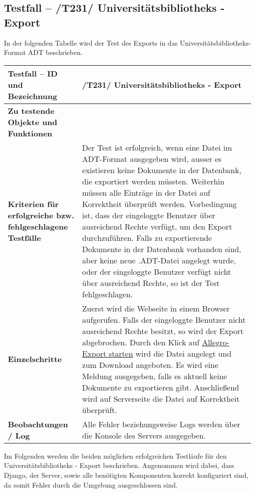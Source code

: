 \subsection{Testfall -- /T231/ Universitätsbibliotheks - Export}
In der folgenden Tabelle wird der Test des Exports in das
Universitätsbibliotheks-Format ADT beschrieben.
\begin{longtable}{|p{5cm}|p{10cm}|}
\hline
\textbf{Testfall -- ID und Bezeichnung} &  \textnormal{/T231/ Universitätsbibliotheks - Export} \\
\hline
\textbf{Zu testende Objekte und Funktionen} & 
\textnormal{
\begin{itemize}
  \item In Komponente \textit{Server (App: Documents)} die Funktion
	\lstinline{extras_allegro.export_allegro()}
\end{itemize} } \\
\hline
\textbf{Kriterien f\"ur erfolgreiche bzw. fehlgeschlagene Testf\"alle} &
\textnormal{Der Test ist erfolgreich, wenn eine Datei im ADT-Format ausgegeben
wird, ausser es existieren keine Dokumente in der Datenbank, die exportiert
werden müssten. Weiterhin müssen alle Einträge in der Datei auf Korrektheit
überprüft werden. Vorbedingung ist, dass der eingeloggte Benutzer über
ausreichend Rechte verfügt, um den Export durchzuführen. Falls zu exportierende
Dokumente in der Datenbank vorhanden sind, aber keine neue .ADT-Datei angelegt
wurde, oder der eingeloggte Benutzer verfügt nicht über ausreichend Rechte, so
ist der Test fehlgeschlagen. } \\
\hline
\textbf{Einzelschritte} & 
\textnormal{Zuerst wird die Webseite in einem Browser aufgerufen. Falls der
eingeloggte Benutzer nicht ausreichend Rechte besitzt, so wird der Export
abgebrochen. Durch den Klick auf \uline{Allegro-Export starten} wird die Datei angelegt und
zum Download angeboten. Es wird eine Meldung ausgegeben, falls es aktuell keine
Dokumente zu exportieren gibt. Anschließend wird auf Serverseite die Datei auf
Korrektheit überprüft. } \\
\hline
\textbf{Beobachtungen / Log} &  \textnormal{Alle Fehler beziehungsweise Logs werden
über die Konsole des Servers ausgegeben. } \\
\hline

 \end{longtable}

Im Folgenden werden die beiden möglichen erfolgreichen Testläufe für den
Universitätsbibliotheks - Export beschrieben. Angenommen wird dabei, dass
Django, der Server, sowie alle benötigten Komponenten korrekt konfiguriert
sind, da somit Fehler durch die Umgebung ausgeschlossen sind.

